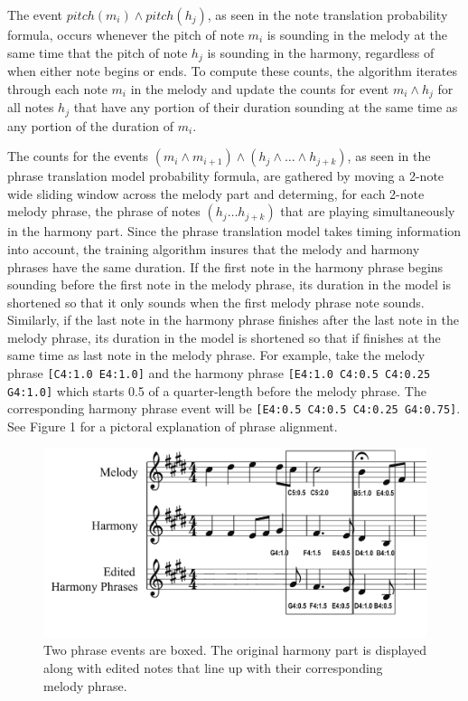 \documentclass{sig-alternate}
\begin{document}
The event $pitch(m_{i}) \wedge pitch(h_{j})$, as seen in the note translation probability formula, occurs whenever the pitch of note $m_{i}$ is sounding in the melody at the same time that the pitch of note $h_{j}$ is sounding in the harmony, regardless of when either note begins or ends. To compute these counts, the algorithm iterates through each note $m_{i}$ in the melody and update the counts for event $m_{i} \wedge h_{j}$ for all notes $h_{j}$ that have any portion of their duration sounding at the same time as any portion of the duration of $m_{i}$.

The counts for the events $(m_{i} \wedge m_{i+1}) \wedge (h_{j} \wedge \ldots \wedge h_{j+k})$, as seen in the phrase translation model probability formula, are gathered by moving a 2-note wide sliding window across the melody part
and determing, for each 2-note melody phrase, the phrase of notes $(h_{j} \ldots h_{j + k})$ that are playing simultaneously in the harmony part. Since the phrase translation model takes timing information into account, the training algorithm insures that the melody and harmony phrases have the same duration. If the first note in the harmony phrase begins sounding before the first note in the melody phrase, its duration in the model is shortened so that it only sounds when the first melody phrase note sounds. Similarly, if the last note in the harmony phrase finishes after the last note in the melody phrase, its duration in the model is shortened so that if finishes at the same time as last note in the melody phrase. For example, take the melody phrase \texttt{[C4:1.0 E4:1.0]} and the harmony phrase \texttt{[E4:1.0 C4:0.5 C4:0.25 G4:1.0]} which starts 0.5 of a quarter-length before the melody phrase. The corresponding harmony phrase event will be \texttt{[E4:0.5 C4:0.5 C4:0.25 G4:0.75]}. See Figure 1 for a pictoral explanation of phrase alignment.

\begin{figure}
	\includegraphics[scale=0.08]{images/phrase_examples.png}
	\caption{Two phrase events are boxed. The original harmony part is displayed along with edited notes that line up with their corresponding melody phrase.}
\end{figure} 
\end{document}
